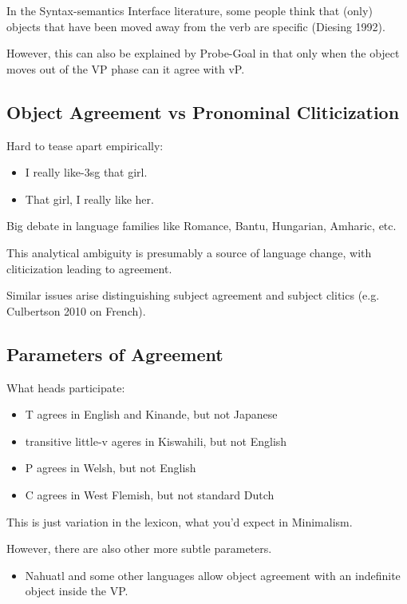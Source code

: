 In the Syntax-semantics Interface literature, some people think that (only) objects that have been moved away from the verb are specific (Diesing 1992).

However, this can also be explained by Probe-Goal in that only when the object moves out of the VP phase can it agree with vP.

\subsection*{Object Agreement vs Pronominal Cliticization}

Hard to tease apart empirically:

\begin{itemize}
  \item I really like-3sg that girl.
  \item That girl, I really like her.
\end{itemize}

Big debate in language families like Romance, Bantu, Hungarian, Amharic, etc.

This analytical ambiguity is presumably a source of language change, with cliticization leading to agreement.

Similar issues arise distinguishing subject agreement and subject clitics (e.g. Culbertson 2010 on French).

\subsection*{Parameters of Agreement}

What heads participate:

\begin{itemize}
  \item T agrees in English and Kinande, but not Japanese
  \item transitive little-v ageres in Kiswahili, but not English
  \item P agrees in Welsh, but not English
  \item C agrees in West Flemish, but not standard Dutch
\end{itemize}

This is just variation in the lexicon, what you'd expect in Minimalism.

However, there are also other more subtle parameters.

\begin{itemize}
  \item Nahuatl and some other languages allow object agreement with an indefinite object inside the VP.
\end{itemize}

